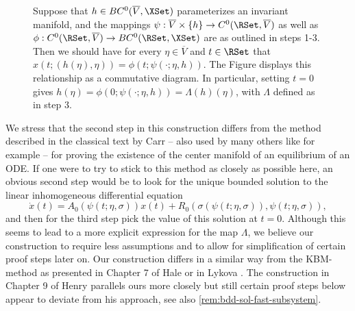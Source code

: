 \documentclass[a4paper]{siamart190516}
\begin{document}
\begin{figure}\label{fig:com-dia-slow-mfd}\centering
{}
\caption{Suppose that $h \in BC^0(\overline{V}, \XSet)$ parameterizes an invariant manifold, and the mappings $\psi : \overline{V} \times \{ h \}\rightarrow C^0(\RSet, \overline{V})$ 
as well as $\phi: C^0(\RSet, \overline{V}) \rightarrow BC^0(\RSet, \XSet)$ are as outlined in steps 1-3. Then we should have for every $\eta \in \overline{V}$ and $t \in \RSet$ 
that $x(t;(h(\eta),\eta)) = \phi(t;\psi(\cdot;\eta,h))$. The Figure displays this relationship as a commutative diagram. In particular, setting $t=0$ gives 
$h(\eta) = \phi(0;\psi(\cdot;\eta,h)) = \Lambda(h)(\eta)$, with $\Lambda$ defined as in step 3.}
\end{figure}
 
 
 \begin{remark}\label{rem:construction-contraction}
We stress that the second step in this construction differs from the method described in the classical text by Carr \cite{Ca81} -- also used by many others like for example \cite{Ke67, Sij85}  -- for proving the existence of the center manifold of an equilibrium of an ODE. If one were to try to stick to this method as closely as possible here, an obvious second step would be to look for the unique bounded solution to the linear inhomogeneous differential equation
 \[
\dot{x}(t) = A_0(\psi(t;\eta,\sigma)) x(t) + R_0(\sigma(\psi(t;\eta,\sigma)),\psi(t;\eta,\sigma)),
\]
and then for the third step pick the value of this solution at $t=0$. Although this
seems to lead to a more explicit expression for the map $\Lambda$, we believe our
construction to require less assumptions and to allow for simplification of certain
proof steps later on. Our construction differs in a similar way from the KBM-method
as presented in Chapter 7 of Hale \cite{Ha80} or in Lykova \cite{Ly92}. The
construction in Chapter 9 of Henry \cite{He81} parallels ours more closely but still
certain proof steps below appear to deviate from his approach, see also
\cref{rem:bdd-sol-fast-subsystem}.
 \end{remark}
\end{document}
